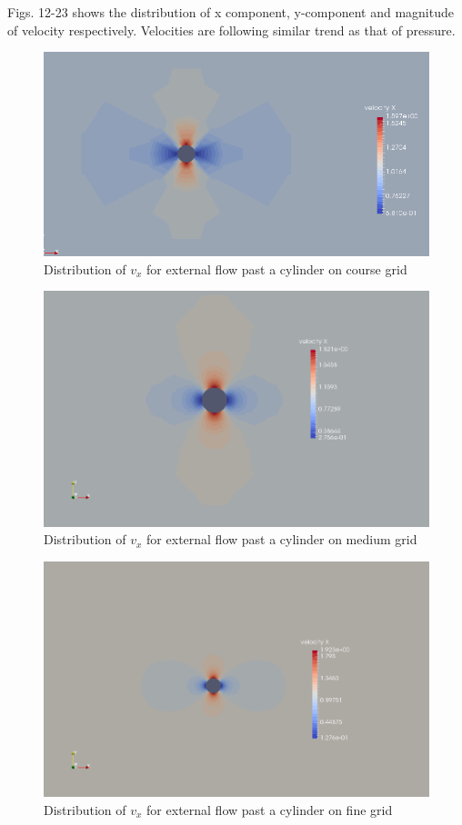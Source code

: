 \documentclass[12pt]{elsarticle}
\begin{document}
	Figs. 12-23 shows the distribution of x component, y-component and magnitude of velocity respectively. Velocities are following similar trend as that of pressure.
	\begin{figure}[h] \label{cyl__velx_cou}
		\centering\includegraphics[width=1.0\linewidth]{velx_cou}
		\caption{Distribution of $v_x$ for external flow past a cylinder on course grid}
	\end{figure}
	
	\begin{figure}[h] \label{cyl__velx_med}
		\centering\includegraphics[width=1.0\linewidth]{velx_med}
		\caption{Distribution of $v_x$ for external flow past a cylinder on medium grid}
	\end{figure}
	
	\begin{figure}[h] \label{cyl__velx_fin}
		\centering\includegraphics[width=1.0\linewidth]{velx_fin}
		\caption{Distribution of $v_x$ for external flow past a cylinder on fine grid}
	\end{figure}
	
\end{document}
